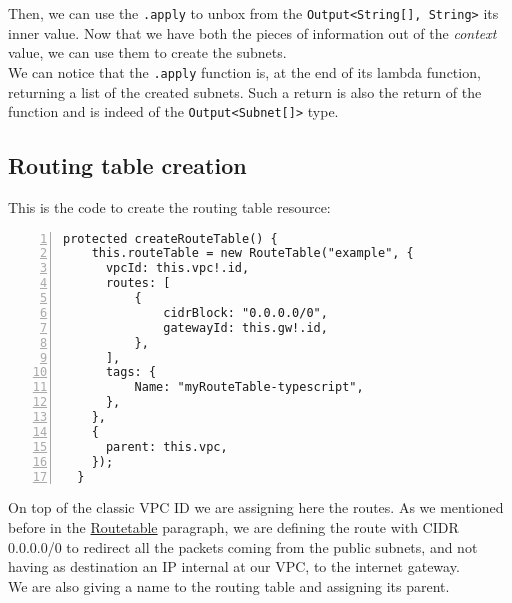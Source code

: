 Then, we can use the \texttt{.apply} to unbox from the \texttt{Output<String[], String>} its inner value.
Now that we have both the pieces of information out of the \textit{context} value, we can use them to create the subnets.\\
We can notice that the \texttt{.apply} function is, at the end of its lambda function, returning a list of the created subnets.
Such a return is also the return of the function and is indeed of the \texttt{Output<Subnet[]>} type.

\subsection{Routing table creation}
This is the code to create the routing table resource:\\
\begin{minipage}{\linewidth}
\begin{lstlisting}[numbers=left, numberstyle=\tiny, numbersep=-5pt, stepnumber=1]
  protected createRouteTable() {
    this.routeTable = new RouteTable("example", {
      vpcId: this.vpc!.id,
      routes: [
          {
              cidrBlock: "0.0.0.0/0",
              gatewayId: this.gw!.id,
          },
      ],
      tags: {
          Name: "myRouteTable-typescript",
      },
    },
    {
      parent: this.vpc,
    });
  }
\end{lstlisting}
\end{minipage}
On top of the classic VPC ID we are assigning here the routes.
As we mentioned before in the \hyperref[sssec:routetable]{Routetable} paragraph, we are defining the route with CIDR 0.0.0.0/0 to redirect all the packets coming from the public subnets, and not having as destination an IP internal at our VPC, to the internet gateway.\\
We are also giving a name to the routing table and assigning its parent.


